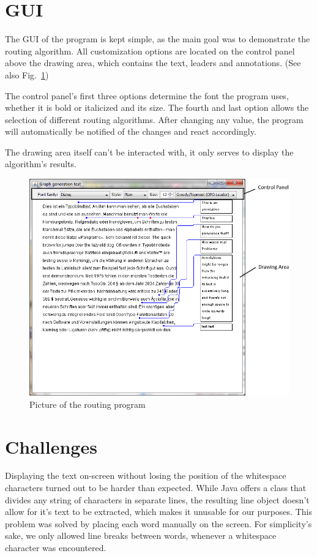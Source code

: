 \documentclass[11pt,a4paper]{vutinfth}
\begin{document}
\section{GUI}
\label{sec:GUI}

The GUI of the program is kept simple, as the main goal was to demonstrate the routing algorithm. All customization options are located on the control panel above the drawing area, which contains the text, leaders and annotations. (See also Fig.~\ref{fig:ProgWindow})

The control panel's first three options determine the font the program uses, whether it is bold or italicized and its size. The fourth and last option allows the selection of different routing algorithms. After changing any value, the program will automatically be notified of the changes and react accordingly.

The drawing area itself can't be interacted with, it only serves to display the algorithm's results.
\begin{figure}
	\captionsetup{justification=centering, margin=0.75cm}
	\centering
	\includegraphics[scale=0.75]{ProgramWindowAnnotated.png}
	\caption{Picture of the routing program}
	\label{fig:ProgWindow}
\end{figure}

\section{Challenges}

Displaying the text on-screen without losing the position of the whitespace characters turned out to be harder than expected. While Java offers a class that divides any string of characters in separate lines, the resulting line object doesn't allow for it's text to be extracted, which makes it unusable for our purposes. This problem was solved by placing each word manually on the screen. For simplicity's sake, we only allowed line breaks between words, whenever a whitespace character was encountered.
\end{document}
